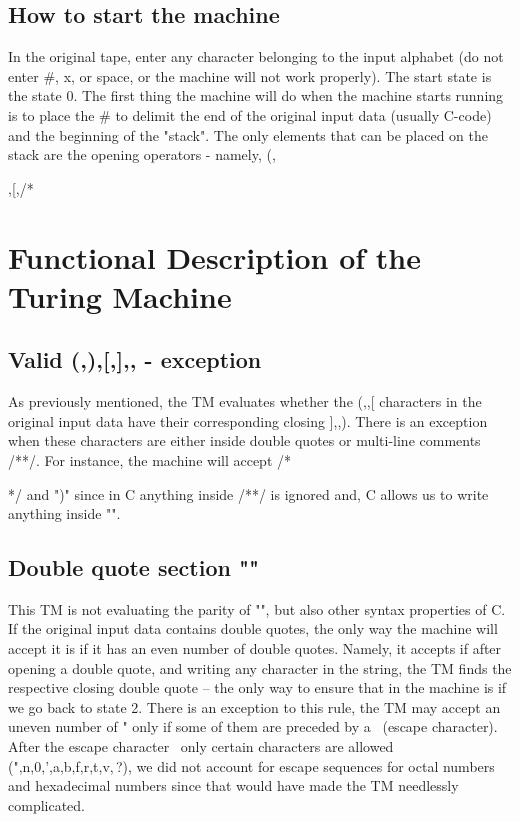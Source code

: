 \documentclass{article}
\begin{document}
\subsection{How to start the machine}
In the original tape, enter any character belonging to the input alphabet (do not enter #, x, or space, or the machine will not work properly). 
The start state is the state 0. The first thing the machine will do when the machine starts running is to place the # to delimit the end of the 
original input data (usually C-code) and the beginning of the "stack". The only elements that can be placed on the stack are the opening 
operators - namely, (,{,[,/* 

\section{Functional Description of the Turing Machine}

\subsection{Valid (,),[,],{,} - exception}
As previously mentioned, the TM evaluates whether the (,{,[ characters in the original input data have their corresponding closing ],},). 
There is an exception when these characters are either inside double quotes or multi-line comments /**/. For instance, the machine will 
accept /*{*/ and ")" since in C anything inside /**/ is ignored and, C allows us to write anything inside "".

\subsection{Double quote section ""}
This TM is not evaluating the parity of "", but also other syntax properties of C. If the original input data contains double quotes, 
the only way the machine will accept it is if it has an even number of double quotes. Namely, it accepts if after opening a double quote, and writing 
any character in the string, the TM finds the respective closing double quote – the only way to ensure that in the machine is if we go back to state 2. 
There is an exception to this rule, the TM may accept an uneven number of " only if some of them are preceded by a \ (escape character). 
After the escape character \ only certain characters are allowed (",n,0,',a,b,f,r,t,v,\,?), we did not account for escape sequences for octal 
numbers  and hexadecimal numbers \xhh since that would have made the TM needlessly complicated.

}}
\end{document}
